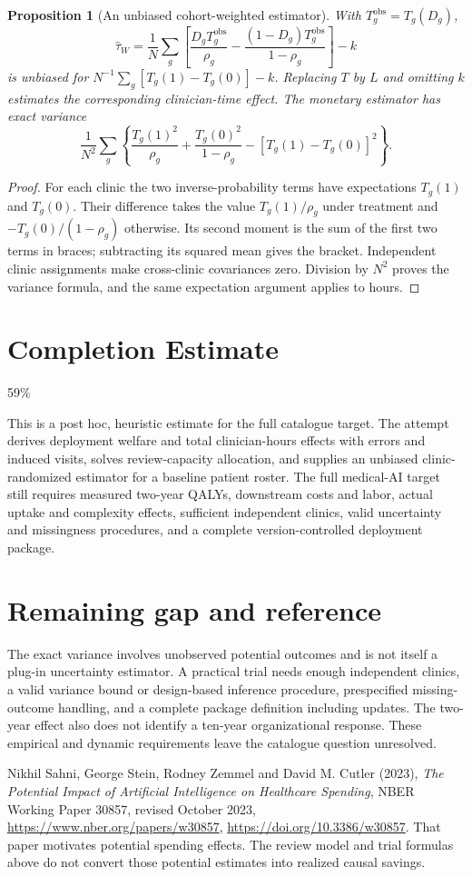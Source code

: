 \documentclass[11pt,a4paper]{article}
\newtheorem{proposition}[theorem]{Proposition}
\theoremstyle{definition}
\theoremstyle{remark}
\begin{document}
\begin{proposition}[An unbiased cohort-weighted estimator]
With $T_g^{\mathrm{obs}}=T_g(D_g)$,
\[
 \widehat\tau_W=\frac1N\sum_g\left[\frac{D_gT_g^{\mathrm{obs}}}{\rho_g}
 -\frac{(1-D_g)T_g^{\mathrm{obs}}}{1-\rho_g}\right]-k
\]
is unbiased for $N^{-1}\sum_g[T_g(1)-T_g(0)]-k$. Replacing $T$ by $L$ and omitting $k$ estimates the corresponding clinician-time effect. The monetary estimator has exact variance
\[
 \frac1{N^2}\sum_g\left\{\frac{T_g(1)^2}{\rho_g}
 +\frac{T_g(0)^2}{1-\rho_g}-[T_g(1)-T_g(0)]^2\right\}.
\]
\end{proposition}
\begin{proof}
For each clinic the two inverse-probability terms have expectations $T_g(1)$ and $T_g(0)$. Their difference takes the value $T_g(1)/\rho_g$ under treatment and $-T_g(0)/(1-\rho_g)$ otherwise. Its second moment is the sum of the first two terms in braces; subtracting its squared mean gives the bracket. Independent clinic assignments make cross-clinic covariances zero. Division by $N^2$ proves the variance formula, and the same expectation argument applies to hours.
\end{proof}

\section{Completion Estimate}
59\%

This is a post hoc, heuristic estimate for the full catalogue target.
The attempt derives deployment welfare and total clinician-hours effects with errors and induced visits, solves review-capacity allocation, and supplies an unbiased clinic-randomized estimator for a baseline patient roster. The full medical-AI target still requires measured two-year QALYs, downstream costs and labor, actual uptake and complexity effects, sufficient independent clinics, valid uncertainty and missingness procedures, and a complete version-controlled deployment package.

\section{Remaining gap and reference}
The exact variance involves unobserved potential outcomes and is not itself a plug-in uncertainty estimator. A practical trial needs enough independent clinics, a valid variance bound or design-based inference procedure, prespecified missing-outcome handling, and a complete package definition including updates. The two-year effect also does not identify a ten-year organizational response. These empirical and dynamic requirements leave the catalogue question unresolved.

Nikhil Sahni, George Stein, Rodney Zemmel and David M. Cutler (2023), \emph{The Potential Impact of Artificial Intelligence on Healthcare Spending}, NBER Working Paper 30857, revised October 2023, \url{https://www.nber.org/papers/w30857}, \url{https://doi.org/10.3386/w30857}. That paper motivates potential spending effects. The review model and trial formulas above do not convert those potential estimates into realized causal savings.
\end{document}
